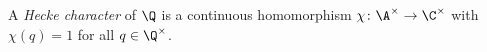 A \emph{Hecke character} of $\Q$ is a continuous homomorphism $\chi\colon\A^\times\to\C^\times$ with $\chi(q)=1$ for
all $q\in\Q^\times$.
